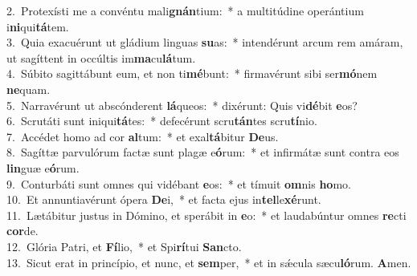 {2.~}Protexísti me a convéntu mali\textbf{gnán}tium:~* a multitúdine operántium i\textbf{ni}qui\textbf{tá}tem.\\
{3.~}Quia exacuérunt ut gládium linguas \textbf{su}as:~* intendérunt arcum rem amáram, ut sagíttent in occúltis im\textbf{ma}cu\textbf{lá}tum.\\
{4.~}Súbito sagittábunt eum, et non ti\textbf{mé}bunt:~* firmavérunt sibi ser\textbf{mó}nem \textbf{ne}quam.\\
{5.~}Narravérunt ut abscónderent \textbf{lá}queos:~* dixérunt: Quis vi\textbf{dé}bit \textbf{e}os?\\
{6.~}Scrutáti sunt iniqui\textbf{tá}tes:~* defecérunt scru\textbf{tán}tes scru\textbf{tí}nio.\\
{7.~}Accédet homo ad cor \textbf{al}tum:~* et exal\textbf{tá}bitur \textbf{De}us.\\
{8.~}Sagíttæ parvulórum factæ sunt plagæ e\textbf{ó}rum:~* et infirmátæ sunt contra eos \textbf{lin}guæ e\textbf{ó}rum.\\
{9.~}Conturbáti sunt omnes qui vidébant \textbf{e}os:~* et tímuit \textbf{om}nis \textbf{ho}mo.\\
{10.~}Et annuntiavérunt ópera \textbf{De}i,~* et facta ejus in\textbf{tel}le\textbf{xé}runt.\\
{11.~}Lætábitur justus in Dómino, et sperábit in \textbf{e}o:~* et laudabúntur omnes \textbf{re}cti \textbf{cor}de.\\
{12.~}Glória Patri, et \textbf{Fí}lio,~* et Spi\textbf{rí}tui \textbf{San}cto.\\
{13.~}Sicut erat in princípio, et nunc, et \textbf{sem}per,~* et in sǽcula sæcu\textbf{ló}rum. \textbf{A}men.\\

